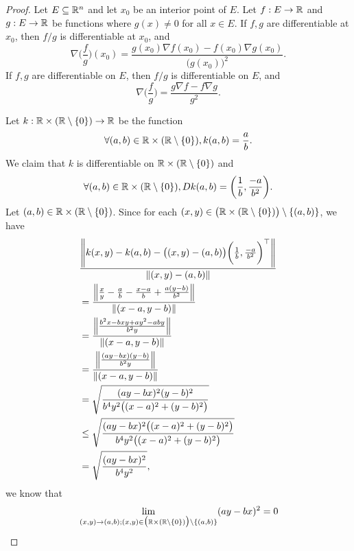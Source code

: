 \begin{proof}
  Let \(E \subseteq \R^n\) and let \(x_0\) be an interior point of \(E\).
  Let \(f : E \to \R\) and \(g : E \to \R\) be functions where \(g(x) \neq 0\) for all \(x \in E\).
  If \(f, g\) are differentiable at \(x_0\), then \(f / g\) is differentiable at \(x_0\), and
  \[
    \nabla \bigg(\frac{f}{g}\bigg)(x_0) = \frac{g(x_0) \nabla f(x_0) - f(x_0) \nabla g(x_0)}{\big(g(x_0)\big)^2}.
  \]
  If \(f, g\) are differentiable on \(E\), then \(f / g\) is differentiable on \(E\), and
  \[
    \nabla \bigg(\frac{f}{g}\bigg) = \frac{g \nabla f - f \nabla g}{g^2}.
  \]

  Let \(k : \R \times (\R \setminus \{0\}) \to \R\) be the function
  \[
    \forall (a, b) \in \R \times (\R \setminus \{0\}), k(a, b) = \frac{a}{b}.
  \]
  We claim that \(k\) is differentiable on \(\R \times (\R \setminus \{0\})\) and
  \[
    \forall (a, b) \in \R \times (\R \setminus \{0\}), D k(a, b) = \bigg(\frac{1}{b}, \frac{-a}{b^2}\bigg).
  \]
  Let \((a, b) \in \R \times (\R \setminus \{0\})\).
  Since for each \((x, y) \in \big(\R \times (\R \setminus \{0\})\big) \setminus \{(a, b)\}\), we have
  \begin{align*}
     & \frac{\norm*{k(x, y) - k(a, b) - \big((x, y) - (a, b)\big) \bigg(\frac{1}{b}, \frac{-a}{b^2}\bigg)^\top}}{\norm*{(x, y) - (a, b)}} \\
     & = \frac{\norm*{\frac{x}{y} - \frac{a}{b} - \frac{x - a}{b} + \frac{a(y - b)}{b^2}}}{\norm*{(x - a, y - b)}}                        \\
     & = \frac{\norm*{\frac{b^2 x - bxy + ay^2 - aby}{b^2y}}}{\norm*{(x - a, y - b)}}                                                     \\
     & = \frac{\norm*{\frac{(ay - bx)(y - b)}{b^2y}}}{\norm*{(x - a, y - b)}}                                                             \\
     & = \sqrt{\frac{(ay - bx)^2 (y - b)^2}{b^4 y^2 \big((x - a)^2 + (y - b)^2\big)}}                                                     \\
     & \leq \sqrt{\frac{(ay - bx)^2 \big((x - a)^2 + (y - b)^2\big)}{b^4 y^2 \big((x - a)^2 + (y - b)^2\big)}}                            \\
     & = \sqrt{\frac{(ay - bx)^2}{b^4 y^2}},
  \end{align*}
  we know that
  \begin{align*}
             & \lim_{(x, y) \to (a, b) ; (x, y) \in \big(\R \times (\R \setminus \{0\})\big) \setminus \{(a, b)\}} (ay - bx)^2 = 0                                                                                                                  \\

\end{align*}
\end{proof}
